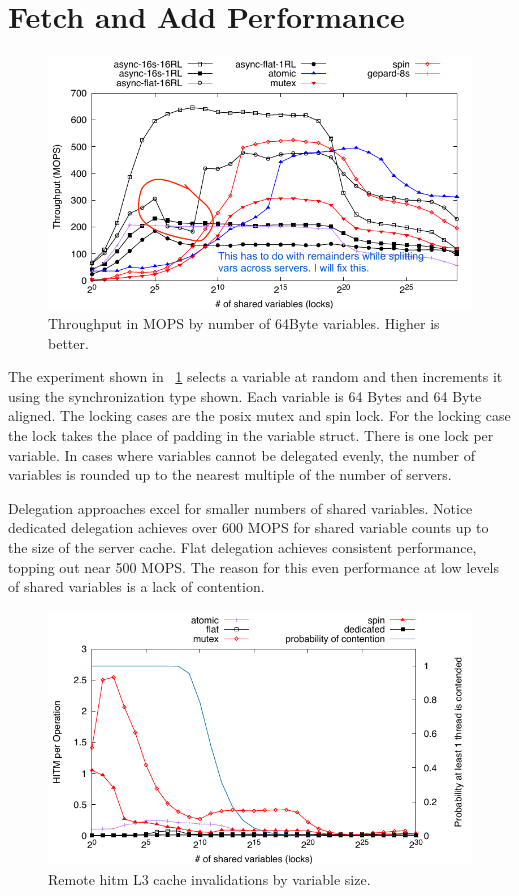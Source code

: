 \documentclass{uicthesi}
\begin{document}
\section{Fetch and Add Performance}
\begin{figure}[ht!]
\centering
\includegraphics[width=0.9\columnwidth]{FIG/fetch_and_add_thput.pdf}
\caption{Throughput in MOPS by number of 64Byte variables. Higher is better. }
\label{fig:fetch_and_add_thput}
\end{figure}

The experiment shown in ~\ref{fig:fetch_and_add_thput} selects a variable at random and then increments it using the synchronization type shown. Each variable is 64 Bytes and 64 Byte aligned. The locking cases are the posix mutex and spin lock. For the locking case the lock takes the place of padding in the variable struct. There is one lock per variable. In cases where variables cannot be delegated evenly, the number of variables is rounded up to the nearest multiple of the number of servers. 

Delegation approaches excel for smaller numbers of shared variables. Notice dedicated delegation achieves over 600 MOPS for shared variable counts up to the size of the server cache. Flat delegation achieves consistent performance, topping out near 500 MOPS. The reason for this even performance at low levels of shared variables is a lack of contention.

\begin{figure}[ht!]
\centering
\includegraphics[width=0.9\columnwidth]{FIG/hitm_per_op.pdf}
\caption{Remote hitm L3 cache invalidations by variable size. }
\label{fig:contention}
\end{figure}
\end{document}
